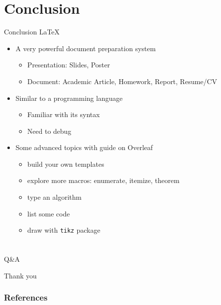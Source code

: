 \documentclass [xcolor=svgnames, t] {beamer}
\begin{document}
\section{Conclusion}
\begin{frame}{Conclusion}
    \LaTeX\
    \begin{itemize}
        \item A very powerful document preparation system
        \begin{itemize}
            \item Presentation: Slides, Poster
            \item Document: Academic Article, Homework, Report, Resume/CV
        \end{itemize}
        \item Similar to a programming language
        \begin{itemize}
            \item Familiar with its syntax
            \item Need to debug
        \end{itemize}
        \item Some advanced topics with guide on Overleaf
        \begin{itemize}
            \item build your own templates
            \item explore more macros: enumerate, itemize, theorem
            \item type an algorithm
            \item list some code
            \item draw with \texttt{tikz} package
        \end{itemize}
    \end{itemize}
\end{frame}

\section*{ }
\begin{frame}[c]{Q\&A}
	\begin{center}
		\Huge Thank you
	\end{center}
\end{frame}


\begin{frame} [allowframebreaks]\frametitle{References}
    
    
\end{frame}
\end{document}
